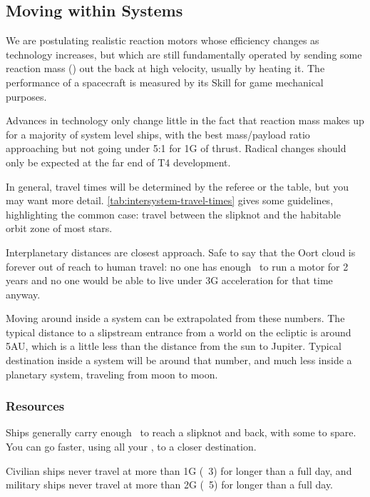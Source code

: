 \subsection{Moving within Systems}
\label{sec:moving-within-systems}



We are postulating realistic reaction motors whose efficiency changes as technology increases, but which are still fundamentally operated by sending some reaction mass (\RMass) out the back at high velocity, usually by heating it. The performance of a spacecraft is measured by its  Skill for game mechanical purposes.

Advances in technology only change little in the fact that reaction mass makes up for a majority of system level ships, with the best mass/payload ratio approaching but not going under 5:1 for 1G of thrust. Radical changes should only be expected at the far end of T4 development.

In general, travel times will be determined by the referee or the table, but you may want more detail.  \autoref{tab:intersystem-travel-times} gives some guidelines, highlighting the common case: travel between the slipknot and the habitable orbit zone of most stars.

Interplanetary distances are closest approach. Safe to say that the Oort cloud is forever out of reach to human travel: no one has enough \RMass\ to run a motor for 2 years and no one would be able to live under 3G acceleration for that time anyway.

Moving around inside a system can be extrapolated from these numbers. The typical distance to a slipstream entrance from a world on the ecliptic is around 5AU, which is a little less than the distance from the sun to Jupiter. Typical destination inside a system will be around that number, and much less inside a planetary system, traveling from moon to moon.
\vfil

\subsubsection{Resources}
\vfil

Ships generally carry enough \RMass\ to reach a slipknot and back, with some to spare. You can go faster, using all your \RMass, to a closer destination.

Civilian ships never travel at more than 1G (\Vshift\ 3) for longer than a full day, and military ships never travel at more than 2G (\Vshift\ 5) for longer than a full day.

